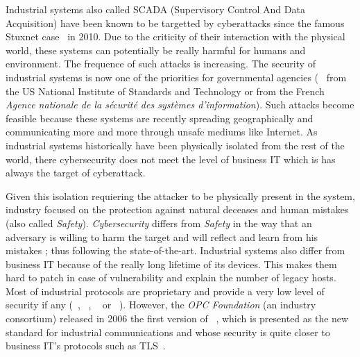 
Industrial systems also called SCADA (Supervisory Control And Data
Acquisition) have been known to be targetted by cyberattacks since the
famous Stuxnet case~\cite{Lan11} in 2010.  Due to the criticity of
their interaction with the physical world, these systems can
potentially be really harmful for humans and environment.  The
frequence of such attacks is increasing.  The security of industrial
systems is now one of the priorities for governmental agencies
(\eg~\cite{SFS11} from the US National Institute of Standards and
Technology or
\cite{ANSSI12_guide_securite_industrielle_en} from the French {\em Agence
nationale de la sécurité des systèmes d'information}).
Such attacks become feasible because these systems are recently spreading
geographically and communicating more and more through unsafe mediums like
Internet.
As industrial systems historically have been physically isolated from the rest
of the world, there cybersecurity does not meet the level of business IT which
is has always the target of cyberattack.

Given this isolation requiering the attacker to be physically present in the
system, industry focused on the protection against natural deceases and human
mistakes (also called {\em Safety}).
{\em Cybersecurity} differs from {\em Safety} in the way that an adversary is
willing to harm the target and will reflect and learn from his mistakes ; thus
following the state-of-the-art.
Industrial systems also differ from business IT because of the really long
lifetime of its devices.
This makes them hard to patch in case of vulnerability and explain the number of
legacy hosts.
Most of industrial protocols are proprietary and provide a very low level of
security if any (\eg \modbus~\cite{MODBUS}, \profinet~\cite{PROFINET}, \etherip~\cite{Bro01} or
\dnp~\cite{CR04}).
However, the {\em OPC Foundation} (an industry consortium) released in 2006 the
first version of \opcua~\cite{MLD09}, which is presented as the new standard for
industrial communications and whose security is quite closer to business IT's
protocols such as TLS~\cite{DR08}.

